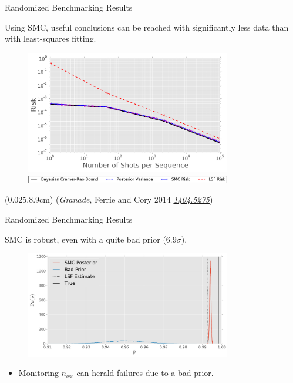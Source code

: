 \documentclass[xcolor=dvipsnames, compress]{beamer}
\renewcommand\UrlFont{\color{red}\rmfamily\itshape}
\newcommand{\arxiv}[1]{\href{https://scirate.com/arxiv/#1}{\UrlFont #1}}
\newcommand{\bottomnote}[1]{
  \begin{textblock*}{0.95\paperwidth} (0.025\paperwidth,8.9cm)
    {\tiny \hfill #1}
  \end{textblock*}
}
\begin{document}
\begin{frame}{Randomized Benchmarking Results}

  Using SMC, useful conclusions can be reached with significantly
  less data than with least-squares fitting.

  \begin{figure}
    \centering
    \includegraphics[width=0.8\textwidth]{figures/risk-tr-comparison} \\
    \includegraphics[width=0.8\textwidth]{figures/risk-comparison-legend-crop}
  \end{figure}

  \bottomnote{(\emph{Granade}, Ferrie and Cory 2014 \arxiv{1404.5275})}

\end{frame}

\begin{frame}{Randomized Benchmarking Results}

    SMC is robust, even with a quite bad prior ($6.9\sigma$).

    \begin{figure}
        \centering
        \includegraphics[width=0.8\textwidth]{figures/bad-prior-distns}
    \end{figure}

    \pause
    \begin{itemize}
        \item Monitoring $n_{\text{ess}}$ can herald failures due to a bad prior.
    \end{itemize}

\end{frame}
\end{document}
